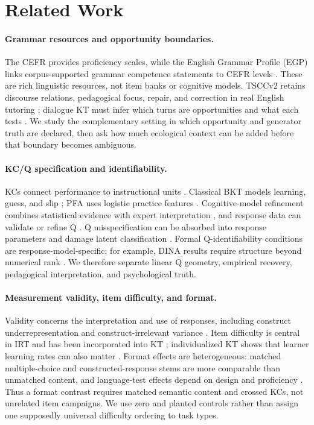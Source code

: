 \section{Related Work}

\paragraph{Grammar resources and opportunity boundaries.}
The CEFR provides proficiency scales, while the English Grammar Profile (EGP)
links corpus-supported grammar competence statements to CEFR levels
\citep{coe-2020-cefr,okeeffe-mark-2017}.  These are rich linguistic resources,
not item banks or cognitive models.  TSCCv2 retains discourse relations,
pedagogical focus, repair, and correction in real English tutoring
\citep{caines-etal-2022-teacher}; dialogue KT must infer which turns are
opportunities and what each tests \citep{scarlatos-etal-2025-dialogue}.  We
study the complementary setting in which opportunity and generator truth are
declared, then ask how much ecological context can be added before that
boundary becomes ambiguous.

\paragraph{KC/Q specification and identifiability.}
KCs connect performance to instructional units \citep{koedinger-etal-2012}.
Classical BKT models learning, guess, and slip
\citep{corbett-anderson-1995}; PFA uses logistic practice features
\citep{pavlik-etal-2009}.  Cognitive-model refinement combines statistical
evidence with expert interpretation \citep{cen-etal-2006}, and response data can
validate or refine Q \citep{de-la-torre-chiu-2016,pardos-dadu-2018}.  Q
misspecification can be absorbed into response parameters and damage latent
classification \citep{rupp-templin-2008}.  Formal Q-identifiability conditions
are response-model-specific; for example, DINA results require structure beyond
numerical rank \citep{gu-xu-2021}.  We therefore separate linear Q geometry,
empirical recovery, pedagogical interpretation, and psychological truth.

\paragraph{Measurement validity, item difficulty, and format.}
Validity concerns the interpretation and use of responses, including construct
underrepresentation and construct-irrelevant variance
\citep{messick-1994,kane-2013}.  Item difficulty is central in IRT and has been
incorporated into KT \citep{pardos-heffernan-2011}; individualized KT shows that
learner learning rates can also matter \citep{yudelson-etal-2013}.  Format
effects are heterogeneous: matched multiple-choice and constructed-response
stems are more comparable than unmatched content, and language-test effects
depend on design and proficiency \citep{rodriguez-2003,innami-koizumi-2009}.
Thus a format contrast requires matched semantic content and crossed KCs, not
unrelated item campaigns.  We use zero and planted controls rather than assign
one supposedly universal difficulty ordering to task types.

